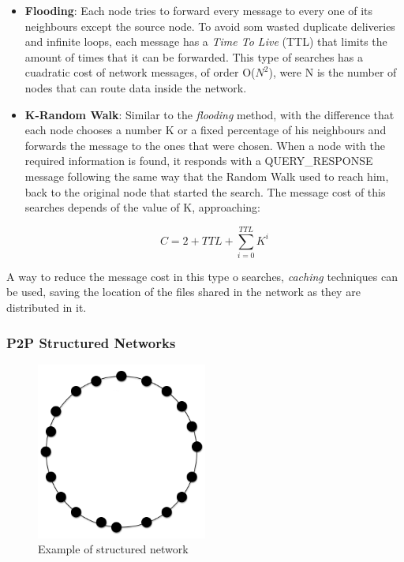 \begin{itemize}
    \item \textbf{Flooding}: 
Each node tries to forward every message to every one of its neighbours except
the source node. To avoid som wasted duplicate deliveries and infinite loops,
each message has a \textit{Time To Live} (TTL) that limits the amount of times
that it can be forwarded. This type of searches has a cuadratic cost of network
messages, of order O($N^2$), were N is the number of nodes that can route data
inside the network.
    \item \textbf{K-Random Walk}: Similar to the \textit{flooding} method, with
the difference that each node chooses a number K or a fixed percentage of his
neighbours and forwards the message to the ones that were chosen. When a node
with the required information is found, it responds with a QUERY\_RESPONSE
message following the same way that the Random Walk used to reach him, back to
the original node that started the search. The message cost of this searches
depends of the value of K, approaching:

\begin{equation}
\label{eq:krandomwalk}
 C = 2 + TTL +
\sum_{i=0}^{TTL} K^i
\end{equation}

\end{itemize}

A way to reduce the message cost in this type o searches, \textit{caching}
techniques can be used, saving the location of the files shared in the network
as they are distributed in it.

\subsubsection{P2P Structured Networks}
\label{sec:p2p_estructured}

\begin{figure}
\center
\includegraphics[width=0.5\textwidth]{img/p2p-structured}
\caption{Example of structured network}
\label{fig:p2p_estructured}
\end{figure}



